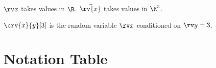 \documentclass{article}
\begin{document}
$\rv x$ takes values in $\R$.
$\vec{\rv{x}}$ takes values in $\R^3$.

$\crv{x}{y}[3]$ is the random variable $\rv x$ conditioned on $\rv y = 3$.

\section*{Notation Table}
\NotationUsedTable
\end{document}
